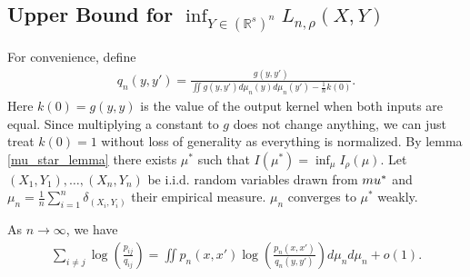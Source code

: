 \subsection{Upper Bound for \texorpdfstring{$\inf_{Y \in (\mathbb{R}^s)^n}L_{n,\rho}(X,Y)$}{L(X,Y)}} \label{tsne:sec:upper_bound}
For convenience, define
\begin{align}
    q_n(y,y') = \frac{g(y,y')}{\iint g(y,y')d \mu_n(y) d \mu_n (y') - \frac{1}{n}k(0)}.
\end{align}
Here $k(0) = g(y,y)$ is the value of the output kernel when both inputs are equal. Since multiplying a constant to $g$ does not change anything, we can just treat $k(0)=1$ without loss of generality as everything is normalized.
By lemma \ref{mu_star_lemma} there exists $\mu^*$ such that $I(\mu^*) = \inf_{\mu}I_{\rho}(\mu)$. Let $(X_1,Y_1), \dots, (X_n,Y_n)$ be i.i.d. random variables drawn from $\\mu^*$ and $\mu_n = \frac{1}{n} \sum_{i=1}^n \delta_{(X_i,Y_i)}$ their empirical measure. $\mu_n$ converges to $\mu^*$ weakly.
\begin{lemma} \label{int_approx_lemma_2}
    As $n \to \infty$, we have
    \begin{align}
        \sum_{i \neq j} \log \left(\frac{p_{ij}}{q_{ij}}\right) = \iint p_n(x,x') \log \left(\frac{p_n(x,x')}{q_n(y,y')}\right) d\mu_n d\mu_n + o(1).
    \end{align}
\end{lemma}
